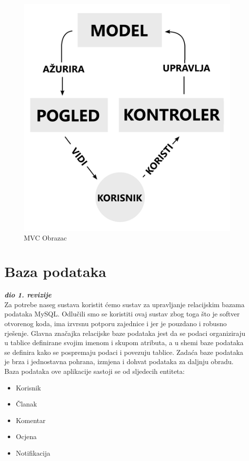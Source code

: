 		\begin{figure}[H]
			\includegraphics[scale=0.2]{slike/MVCObrazac.PNG}
			\centering
			\caption{MVC Obrazac}
			\label{fig:mvc_obrazac}
		\end{figure}

		\eject

				
		\section{Baza podataka}
			
			\textbf{\textit{dio 1. revizije}}\\
			
			Za potrebe naseg sustava koristit ćemo sustav za upravljanje relacijskim bazama podataka MySQL.
   			Odlučili smo se koristiti ovaj sustav zbog toga što je softver otvorenog koda, ima izvrsnu potporu zajednice i jer je pouzdano i robusno rješenje.
			Glavna značajka relacijske baze podataka jest da se podaci organiziraju u tablice definirane svojim imenom i skupom atributa, a u shemi baze podataka se definira kako se 				pospremaju podaci i povezuju tablice.
   			Zadaća baze podataka je brza i jednostavna pohrana, izmjena i dohvat podataka za daljnju obradu.
			Baza podataka ove aplikacije sastoji se od sljedecih entiteta: 
			\begin{itemize}
				\item Korisnik
				\item Članak
				\item Komentar
				\item Ocjena
				\item Notifikacija
			  \end{itemize}
		
